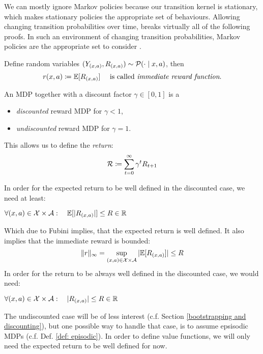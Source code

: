 We can mostly ignore Markov policies because our transition kernel is stationary, which makes stationary policies the appropriate set of behaviours. Allowing changing transition probabilities over time, breaks virtually all of the following proofs. In such an environment of changing transition probabilities, Markov policies are the appropriate set to consider \parencite[c.f.][]{putermanMarkovDecisionProcesses2005}.

\begin{definition}
	Define random variables \((Y_{(x,a)}, R_{(x,a)})\sim \mathcal{P}(\cdot\mid x,a) \), then 
	\[
		r(x,a)\coloneqq \mathbb{E}[R_{(x,a)}] \quad\text{ is called \emph{immediate reward function}.}
	\]
	\end{definition}

\begin{definition}
An MDP together with a discount factor \(\gamma\in[0,1]\) is a
\begin{itemize}[nosep]
	\item \emph{discounted} reward MDP for \(\gamma <1 \),
	\item \emph{undiscounted} reward MDP for \(\gamma=1 \).
\end{itemize}
This allows us to define the \emph{return}:
\[
	\mathcal{R}\coloneqq\sum_{t=0}^{\infty}\gamma^t R_{t+1}
\]
\end{definition}
In order for the expected return to be well defined in the discounted case, we need at least:
\begin{assumption} \label{assumption boundedness}
	\(\forall (x,a)\in\mathcal{X}\times\mathcal{A}:\quad\mathbb{E}[|R_{(x,a)}|]\le R\in\mathbb{R}\)
\end{assumption}
Which due to Fubini implies, that the expected return is well defined. It also implies that the immediate reward is bounded:
\[
	\|r\|_{\infty}=\sup_{(x,a)\in\mathcal{X}\times\mathcal{A}}|\mathbb{E}[R_{(x,a)}]|\le R
\]
In order for the return to be always well defined in the discounted case, we would need:
\begin{assumption} \label{assumption boundedness 2}
	\(\forall (x,a)\in\mathcal{X}\times\mathcal{A}:\quad |R_{(x,a)}| \le R\in\mathbb{R}\)
\end{assumption}

The undiscounted case will be of less interest (c.f. Section \ref{bootstrapping and discounting}), but one possible way to handle that case, is to assume epsisodic MDPs (c.f. Def. \ref{def: episodic}). In order to define value functions, we will only need the expected return to be well defined for now.

